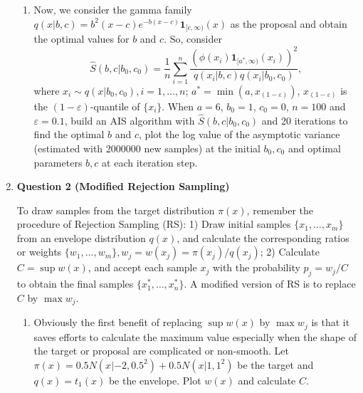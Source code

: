 \documentclass[notitlepage,a4paper,12pt]{article}%
\begin{document}
\begin{enumerate}
\begin{enumerate}
\item 
Now, we consider the gamma family $q(x|b,c)=b^2(x-c)e^{-b(x-c)}\mathbf{1}_{[c,\infty)}(x)$ as the 
proposal and obtain the optimal values for $b$ and $c$. So, consider
$$
\hat{S}(b,c|b_0,c_0)=\frac{1}{n}\sum_{i=1}^n\frac{(\phi(x_i)\mathbf{1}_{[a^*,\infty)}(x_i))^2}{q(x_i|b,c)q(x_i|b_0,c_0)}, 
$$
where $x_i\sim q(x|b_0,c_0), i=1,\dots,n$; $a^*=\min(a, x_{(1-\varepsilon)})$, $x_{(1-\varepsilon)}$ is the $(1-\varepsilon)$-quantile of $\{x_i\}$. When $a=6$, $b_0=1$, $c_0=0$, $n=100$ and $\varepsilon=0.1$, build an AIS algorithm with $\hat{S}(b,c|b_0,c_0)$ and 20 iterations to find the optimal $b$ and $c$, plot
the log value of the asymptotic variance (estimated with 2000000 new samples) at the initial
$b_0,c_0$ and optimal parameters $b,c$ at each iteration step. 


\end{enumerate}

\item
\textbf{Question 2 (Modified Rejection Sampling)}


To draw samples from the target distribution $\pi(x)$, remember the procedure of Rejection Sampling (RS): 1) Draw initial samples $\{x_1,\dots,x_m\}$ from an envelope distribution $q(x)$, and calculate the corresponding ratios or weights $\{w_1,...,w_m\},w_j=w(x_j)=\pi(x_j)/q(x_j)$; 2) Calculate $C=\sup w(x)$, and accept each sample $x_j$ with the probability $p_j=w_j/C$ to obtain the final samples $\{x_1^*,\dots,x_n^*\}$. A modified version of RS is to replace $C$ by $\max w_j$.

\begin{enumerate}
\item Obviously the first benefit of replacing $\sup w(x)$ by $\max w_j$ is that it saves efforts to calculate the maximum value especially when the shape of the target or proposal are complicated or non-smooth. Let 
    $\pi(x)=0.5N(x|-2,0.5^2)+0.5N(x|1,1^2)$ be the target and $q(x)=t_1(x)$ be the envelope.
    Plot $w(x)$ and calculate $C$.


\end{enumerate}
\end{enumerate}
\end{document}
